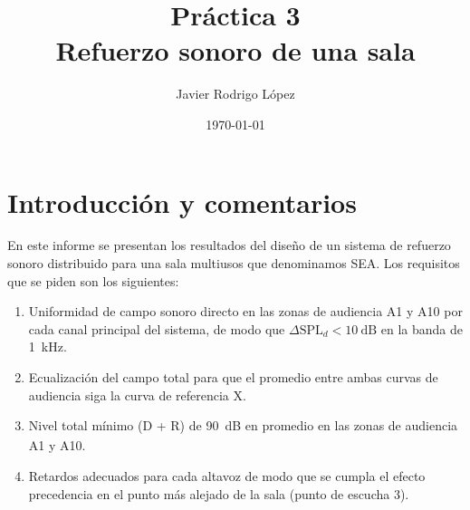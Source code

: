 \documentclass{article}
\begin{document}
\title{\textbf{Práctica 3\\Refuerzo sonoro de una sala}}
\author{Javier Rodrigo López}
\date{\today}
\maketitle


{
}

\thispagestyle{firststyle}


\fancyhead{}
\pagestyle{fancy}

\pagestyle{fancy}

\setcounter{figure}{0}
\setlength{\parskip}{0.5em}

\hypersetup{
    citecolor=black,
    filecolor=black,
    linkcolor=black,
    urlcolor=blueX
}

\tableofcontents
\listoffigures


\newpage

\setcounter{page}{2}

\section{Introducción y comentarios}

En este informe se presentan los resultados del diseño de un sistema de refuerzo sonoro distribuido para una sala multiusos que denominamos SEA. Los requisitos que se piden son los siguientes:

\begin{enumerate}
    \item Uniformidad de campo sonoro directo en las zonas de audiencia A1 y A10 por cada canal principal del sistema, de modo que $\Delta \text{SPL} _{d} < \qty{10}{\dB} $ en la banda de \qty{1}{\kilo \hertz }.
    \item Ecualización del campo total para que el promedio entre ambas curvas de audiencia siga la curva de referencia X.
    \item Nivel total mínimo (D + R) de \qty{90}{\dB_{}} en promedio en las zonas de audiencia A1 y A10.
    \item Retardos adecuados para cada altavoz de modo que se cumpla el efecto precedencia en el punto más alejado de la sala (punto de escucha 3).
\end{enumerate}
\end{document}
